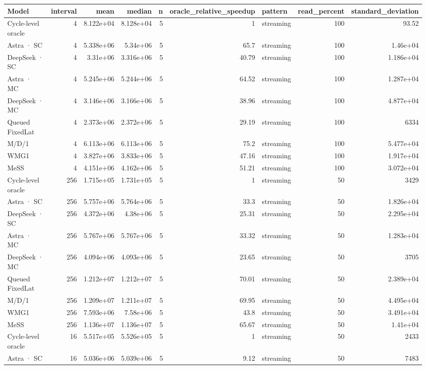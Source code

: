 \begin{tabular}{lrrrrrlrr}
\toprule
Model & interval & mean & median & n & oracle\_relative\_speedup & pattern & read\_percent & standard\_deviation \\
\midrule
Cycle-level oracle & 4 & 8.122e+04 & 8.128e+04 & 5 & 1 & streaming & 100 & 93.52 \\
Astra · SC & 4 & 5.338e+06 & 5.34e+06 & 5 & 65.7 & streaming & 100 & 1.46e+04 \\
DeepSeek · SC & 4 & 3.31e+06 & 3.316e+06 & 5 & 40.79 & streaming & 100 & 1.186e+04 \\
Astra · MC & 4 & 5.245e+06 & 5.244e+06 & 5 & 64.52 & streaming & 100 & 1.287e+04 \\
DeepSeek · MC & 4 & 3.146e+06 & 3.166e+06 & 5 & 38.96 & streaming & 100 & 4.877e+04 \\
Queued FixedLat & 4 & 2.373e+06 & 2.372e+06 & 5 & 29.19 & streaming & 100 & 6334 \\
M/D/1 & 4 & 6.113e+06 & 6.113e+06 & 5 & 75.2 & streaming & 100 & 5.477e+04 \\
WMG1 & 4 & 3.827e+06 & 3.833e+06 & 5 & 47.16 & streaming & 100 & 1.917e+04 \\
MeSS & 4 & 4.151e+06 & 4.162e+06 & 5 & 51.21 & streaming & 100 & 3.072e+04 \\
Cycle-level oracle & 256 & 1.715e+05 & 1.731e+05 & 5 & 1 & streaming & 50 & 3429 \\
Astra · SC & 256 & 5.757e+06 & 5.764e+06 & 5 & 33.3 & streaming & 50 & 1.826e+04 \\
DeepSeek · SC & 256 & 4.372e+06 & 4.38e+06 & 5 & 25.31 & streaming & 50 & 2.295e+04 \\
Astra · MC & 256 & 5.767e+06 & 5.767e+06 & 5 & 33.32 & streaming & 50 & 1.283e+04 \\
DeepSeek · MC & 256 & 4.094e+06 & 4.093e+06 & 5 & 23.65 & streaming & 50 & 3705 \\
Queued FixedLat & 256 & 1.212e+07 & 1.212e+07 & 5 & 70.01 & streaming & 50 & 2.389e+04 \\
M/D/1 & 256 & 1.209e+07 & 1.211e+07 & 5 & 69.95 & streaming & 50 & 4.495e+04 \\
WMG1 & 256 & 7.593e+06 & 7.58e+06 & 5 & 43.8 & streaming & 50 & 3.491e+04 \\
MeSS & 256 & 1.136e+07 & 1.136e+07 & 5 & 65.67 & streaming & 50 & 1.41e+04 \\
Cycle-level oracle & 16 & 5.517e+05 & 5.526e+05 & 5 & 1 & streaming & 50 & 2433 \\
Astra · SC & 16 & 5.036e+06 & 5.039e+06 & 5 & 9.12 & streaming & 50 & 7483 \\

\end{tabular}
